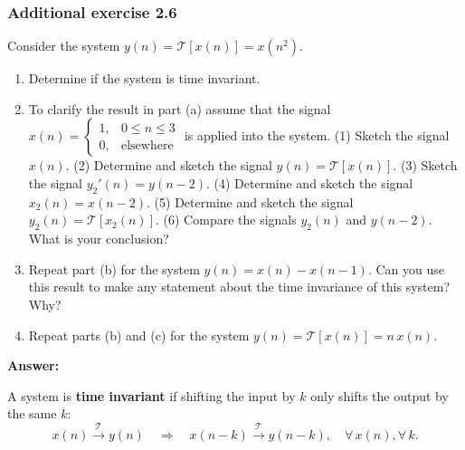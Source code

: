 \documentclass[12pt,a4paper]{article}
\begin{document}
\subsubsection*{Additional exercise 2.6}\label{sec:a26}
\noindent Consider the system $y(n) = \mathcal{T}[x(n)] = x(n^2)$.
\begin{enumerate}[label=\textbf{(\alph*)}, leftmargin=*]
    \item Determine if the system is time invariant.
    \item To clarify the result in part (a) assume that the signal
    $x(n) = \begin{cases} 1, & 0 \le n \le 3\\ 0, & \text{elsewhere}\end{cases}$
    is applied into the system.
    (1) Sketch the signal $x(n)$.
    (2) Determine and sketch the signal $y(n) = \mathcal{T}[x(n)]$.
    (3) Sketch the signal $y_2'(n) = y(n-2)$.
    (4) Determine and sketch the signal $x_2(n) = x(n-2)$.
    (5) Determine and sketch the signal $y_2(n) = \mathcal{T}[x_2(n)]$.
    (6) Compare the signals $y_2(n)$ and $y(n-2)$. What is your conclusion?
    \item Repeat part (b) for the system $y(n) = x(n) - x(n-1)$. Can you use this result to make any statement about the time invariance of this system? Why?
    \item Repeat parts (b) and (c) for the system $y(n) = \mathcal{T}[x(n)] = n\,x(n)$.
\end{enumerate}

\noindent\textbf{Answer:}

A system is \textbf{time invariant} if shifting the input by $k$ only shifts the output by the same $k$:
\[ x(n) \xrightarrow{\ \mathcal{T}\ } y(n) \quad \Longrightarrow \quad x(n-k) \xrightarrow{\ \mathcal{T}\ } y(n-k), \quad \forall\, x(n), \forall\, k. \]
\end{document}
